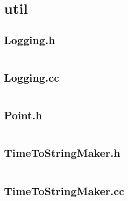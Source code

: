 \documentclass[../main.tex]{subfiles}
\begin{document}
\section{util}

\subsection{Logging.h}\label{lst:util-logging-h}
\inputminted[linenos=true]{cpp}{parts/code/util/Logging.h}

\subsection{Logging.cc}\label{lst:util-logging-cc}
\inputminted[linenos=true]{cpp}{parts/code/util/Logging.cc}

\subsection{Point.h}\label{lst:util-point-h}
\inputminted[linenos=true]{cpp}{parts/code/util/Point.h}

\subsection{TimeToStringMaker.h}\label{lst:util-time-to-string-maker-h}
\inputminted[linenos=true]{cpp}{parts/code/util/TimeToStringMaker.h}

\subsection{TimeToStringMaker.cc}\label{lst:util-time-to-string-maker-cc}
\inputminted[linenos=true]{cpp}{parts/code/util/TimeToStringMaker.cc}
\end{document}
